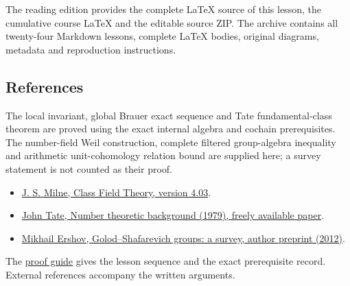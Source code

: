 \documentclass[11pt,a4paper]{article}
\newcommand{\tightlist}{\setlength{\itemsep}{0pt}\setlength{\parskip}{0pt}}
\begin{document}
The reading edition provides the complete LaTeX source of this lesson,
the cumulative course LaTeX and the editable source ZIP. The archive
contains all twenty-four Markdown lessons, complete LaTeX bodies,
original diagrams, metadata and reproduction instructions.

\subsection{References}\label{references}

The local invariant, global Brauer exact sequence and Tate
fundamental-class theorem are proved using the exact internal algebra
and cochain prerequisites. The number-field Weil construction, complete
filtered group-algebra inequality and arithmetic unit-cohomology
relation bound are supplied here; a survey statement is not counted as
their proof.

\begin{itemize}
\tightlist
\item
  \href{https://www.jmilne.org/math/CourseNotes/CFT.pdf}{J. S. Milne,
  Class Field Theory, version 4.03}.
\item
  \href{https://ncatlab.org/nlab/files/TateNumberTheory.pdf}{John Tate,
  Number theoretic background (1979), freely available paper}.
\item
  \href{https://m-ershov.github.io/Research/gssurvey_revised.pdf}{Mikhail
  Ershov, Golod--Shafarevich groups: a survey, author preprint (2012)}.
\end{itemize}

The \href{../free-proofs.html}{proof guide} gives the lesson sequence
and the exact prerequisite record. External references accompany the
written arguments.
\end{document}
